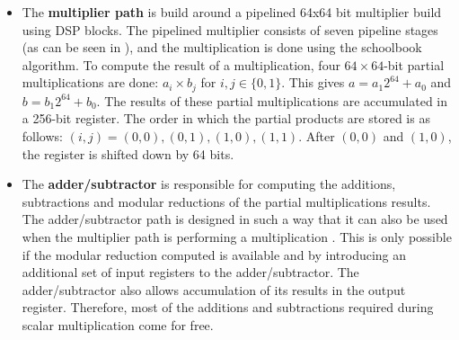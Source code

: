 \begin{itemize}
	\item The \textbf{multiplier path} is build around a pipelined 64x64 bit multiplier build using DSP blocks.
	The pipelined multiplier consists of seven pipeline stages (as can be seen in ), and the multiplication is done using the schoolbook algorithm.
	To compute the result of a multiplication, four $64 \times 64$-bit partial multiplications are done: $a_i \times b_j$ for $i, j \in \{0, 1\}$.
	This gives $a = a_1 2^{64} + a_0$ and $b = b_1 2^{64} + b_0$.
	The results of these partial multiplications are accumulated in a 256-bit register.
	The order in which the partial products are stored is as follows: $(i, j) = (0, 0), (0, 1), (1, 0), (1, 1)$.
	After $(0, 0)$ and $(1, 0)$, the register is shifted down by 64 bits.
	
	\item The \textbf{adder/subtractor} is responsible for computing the additions, subtractions and modular reductions of the partial multiplications results.
	The adder/subtractor path is designed in such a way that it can also be used when the multiplier path is performing a multiplication \cite{jarvinen2016four}. 
	This is only possible if the modular reduction computed is available and by introducing an additional set of input registers to the adder/subtractor.
	The adder/subtractor also allows accumulation of its results in the output register. 
	Therefore, most of the additions and subtractions required during scalar multiplication come for free.
\end{itemize}
%

